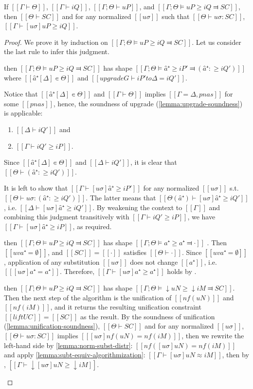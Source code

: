 \begin{lemma} \label{lemma:pos-subt-soundness}
    If $[[Γ ⊢ Θ]]$, $[[Γ ⊢ iQ]]$, $[[Γ ; Θ ⊢ uP]]$, and 
    $[[Γ ; Θ ⊨ uP ≥ iQ ⫤ SC]]$,
    then $[[Θ ⊢ SC]]$ and
    for any normalized $[[uσ]]$ such that $[[Θ ⊢ uσ : SC]]$,
    $[[ Γ ⊢ [uσ]uP ≥ iQ ]]$.
\end{lemma}
\begin{proof} 
    We prove it by induction on $[[Γ ; Θ ⊨ uP ≥ iQ ⫤ SC]]$. 
    Let us consider the last rule to infer this judgment.
    \begin{caseof}
    \item {} then
    $[[Γ ; Θ ⊨ uP ≥ iQ ⫤ SC]]$ has shape $[[Γ;Θ ⊨ â⁺ ≥ iP' ⫤ (â⁺ :≥ iQ')]]$ where
    $[[â⁺[Δ] ∊ Θ]]$ and $[[upgrade G ⊢ iP' to Δ = iQ']]$.

    Notice that $[[â⁺[Δ] ∊ Θ]]$ and $[[Γ ⊢ Θ]]$ 
    implies $[[Γ = Δ, pnas]]$ for some $[[pnas]]$, hence, the
    soundness of upgrade (\cref{lemma:upgrade-soundness}) is applicable:
    \begin{enumerate}
        \item $[[Δ ⊢ iQ']]$ and
        \item $[[Γ ⊢ iQ' ≥ iP]]$.
    \end{enumerate}

    Since $[[â⁺[Δ] ∊ Θ]]$ and $[[Δ ⊢ iQ']]$, 
    it is clear that $[[ Θ ⊢ (â⁺ :≥ iQ') ]]$.

    It is left to show that $[[Γ ⊢ [uσ]â⁺ ≥ iP']]$ for any normalized $[[uσ]]$ 
    s.t. $[[Θ ⊢ uσ : (â⁺ :≥ iQ')]]$.
    The latter means that $[[ Θ(â⁺) ⊢ [uσ]â⁺ ≥ iQ' ]]$, i.e. $[[Δ ⊢ [uσ]â⁺ ≥ iQ']]$. 
    By weakening the context to $[[Γ]]$ and combining this judgment
    transitively with $[[Γ ⊢ iQ' ≥ iP]]$, we have $[[Γ ⊢ [uσ]â⁺ ≥ iP]]$,
    as required. 

    \item \label{case:pos-subt-soundness:var}   
    then $[[Γ ; Θ ⊨ uP ≥ iQ ⫤ SC]]$ has shape $[[Γ;Θ ⊨ a⁺ ≥ a⁺ ⫤ ·]]$ .
    Then $[[uv a⁺ = ∅]]$, and $[[SC]] = [[·]]$ satisfies $[[Θ ⊢ ·]]$.
    Since $[[uv a⁺ = ∅]]$, application of any substitution $[[uσ]]$ 
     does not change $[[a⁺]]$, i.e. $[[ [uσ] a⁺ = a⁺]]$.
      Therefore, $[[Γ ⊢ [uσ]a⁺ ≥ a⁺]]$ holds by .

    \item \label{case:pos-subt-soundness:shift} 
      then
    $[[Γ ; Θ ⊨ uP ≥ iQ ⫤ SC]]$ has shape $[[Γ;Θ ⊨ ↓uN ≥ ↓iM ⫤ SC]]$.\\
    Then the next step of the algorithm is the unification of $[[nf(uN)]]$ and $[[nf(iM)]]$,
    and it returns the resulting unification constraint $[[lift UC]] = [[SC]]$ as the result.
    By the soundness of unification (\cref{lemma:unification-soundness}),
    $[[Θ ⊢ SC]]$ and for any normalized $[[uσ]]$, $[[Θ ⊢ uσ : SC]]$
    implies $[[ [uσ]nf(uN) = nf(iM) ]]$, 
    then we rewrite the left-hand side by \cref{lemma:norm-subst-distr}:
    $[[ nf([uσ]uN) = nf(iM) ]]$ and apply \cref{lemma:subt-equiv-algorithmization}:
    $[[Γ ⊢ [uσ]uN ≈ iM]]$, then by ,
    $[[Γ ⊢ ↓[uσ]uN ≥ ↓iM]]$.
    

\end{caseof}
\end{proof}
